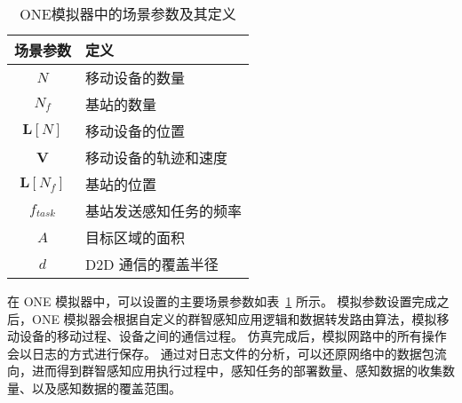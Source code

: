 \begin{table}[h]
  \caption{ONE模拟器中的场景参数及其定义}
  \vspace{-0.5em}
  \centering
  \label{table_notations_ONE}
  \begin{tabular}{|c|p{7cm}|}
  \hline
  \textbf{场景参数} & \textbf{定义}\\
  \hline
  $N$ & 移动设备的数量\\\hline
  $N_f$ & 基站的数量\\\hline
  $\boldsymbol{L}[N]$ & 移动设备的位置\\\hline
  $\boldsymbol{V}$ & 移动设备的轨迹和速度\\\hline
  $\boldsymbol{L}[N_f]$ & 基站的位置\\\hline
  $f_{task}$ & 基站发送感知任务的频率\\\hline
  $A$ & 目标区域的面积\\\hline
  $d$ & D2D 通信的覆盖半径\\\hline
  \end{tabular}
\end{table}

在 ONE 模拟器中，可以设置的主要场景参数如表~\ref{table_notations_ONE} 所示。
模拟参数设置完成之后，ONE 模拟器会根据自定义的群智感知应用逻辑和数据转发路由算法，模拟移动设备的移动过程、设备之间的通信过程。
仿真完成后，模拟网路中的所有操作会以日志的方式进行保存。
通过对日志文件的分析，可以还原网络中的数据包流向，进而得到群智感知应用执行过程中，感知任务的部署数量、感知数据的收集数量、以及感知数据的覆盖范围。



